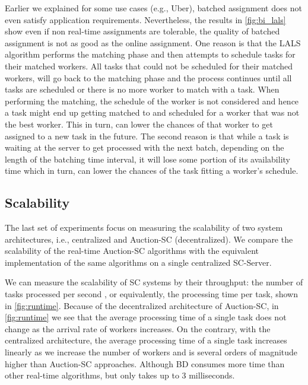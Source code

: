 Earlier we explained for some use cases (e.g., Uber), batched assignment does not even satisfy application requirements. Nevertheless, the results in \cref{fig:bi_lals} show even if non real-time assignments are tolerable, the quality of batched assignment is not as good as the online assignment. One reason is that the LALS algorithm performs the matching phase and then attempts to schedule tasks for their matched workers. All tasks that could not be scheduled for their matched workers, will go back to the matching phase and the process continues until all tasks are scheduled or there is no more worker to match with a task. When performing the matching, the schedule of the worker is not considered and hence a task might end up getting matched to and scheduled for a worker that was not the best worker. This in turn, can lower the chances of that worker to get assigned to a new task in the future. The second reason is that while a task is waiting at the server to get processed with the next batch, depending on the length of the batching time interval, it will lose some portion of its availability time which in turn, can lower the chances of the task fitting a worker's schedule.

\subsection{Scalability}
\label{subsec:exp_scale}
The last set of experiments focus on measuring the scalability of two system architectures, i.e., centralized and Auction-SC (decentralized). We compare the scalability of the real-time Auction-SC algorithms with the equivalent implementation of the same algorithms on a single centralized SC-Server. 

We can measure the scalability of SC systems by their throughput: the number of tasks processed per second , or equivalently, the processing time per task, shown in \cref{fig:runtime}. Because of the decentralized architecture of Auction-SC, in \cref{fig:runtime} we see that the average processing time of a single task does not change as the arrival rate of workers increases. On the contrary, with the centralized architecture, the average processing time of a single task increases linearly as we increase the number of workers and is several orders of magnitude higher than Auction-SC approaches. Although BD consumes more time than other real-time algorithms, but only takes up to 3 milliseconds.

